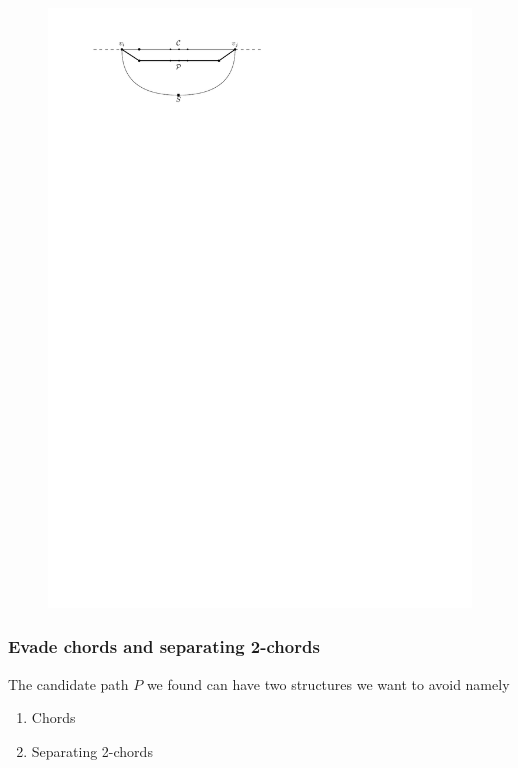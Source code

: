     \begin{figure}[h]
      \centering
      \includegraphics[scale=1]{unifiedAlgo/img/sweep/noIrregularity}
      \caption{}
      \label{fig:sweep:noIrregularity}
    \end{figure}

  \subsubsection{Evade chords and separating 2-chords}
    The candidate path $P$ we found can have two structures we want to avoid
    namely
    \begin{enumerate}
      \itemsep=-4pt
      \item Chords
      \item Separating 2-chords
    \end{enumerate}

